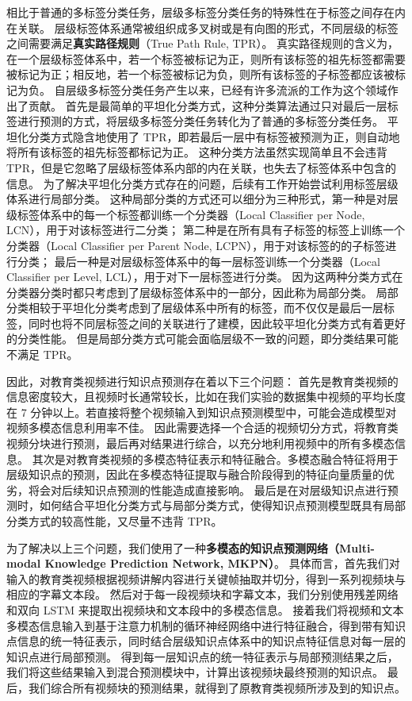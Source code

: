    相比于普通的多标签分类任务，层级多标签分类任务的特殊性在于标签之间存在内在关联。
    层级标签体系通常被组织成多叉树或是有向图的形式，不同层级的标签之间需要满足\textbf{真实路径规则}（True Path Rule, TPR）\cite{Valentini2009TruePR}。
    真实路径规则的含义为，在一个层级标签体系中，若一个标签被标记为正，则所有该标签的祖先标签都需要被标记为正；相反地，若一个标签被标记为负，则所有该标签的子标签都应该被标记为负。
    自层级多标签分类任务产生以来，已经有许多流派的工作为这个领域作出了贡献。
    首先是最简单的平坦化分类方式，这种分类算法通过只对最后一层标签\cite{Barbedo2007AutomaticGC}进行预测的方式，将层级多标签分类任务转化为了普通的多标签分类任务。
    平坦化分类方式隐含地使用了 TPR，即若最后一层中有标签被预测为正，则自动地将所有该标签的祖先标签都标记为正。
    这种分类方法虽然实现简单且不会违背 TPR，但是它忽略了层级标签体系内部的内在关联，也失去了标签体系中包含的信息。
    为了解决平坦化分类方式存在的问题，后续有工作开始尝试利用标签层级体系进行局部分类。
    这种局部分类的方式还可以细分为三种形式，第一种是对层级标签体系中的每一个标签都训练一个分类器（Local Classifier per Node, LCN）\cite{CesaBianchi2004IncrementalAF}，用于对该标签进行二分类；
    第二种是在所有具有子标签的标签上训练一个分类器（Local Classifier per Parent Node, LCPN）\cite{Secker2007AnEC}，用于对该标签的的子标签进行分类；
    最后一种是对层级标签体系中的每一层标签训练一个分类器（Local Classifier per Level, LCL）\cite{Freitas2007ATO}，用于对下一层标签进行分类。
    因为这两种分类方式在分类器分类时都只考虑到了层级标签体系中的一部分，因此称为局部分类。
    局部分类相较于平坦化分类考虑到了层级体系中所有的标签，而不仅仅是最后一层标签，同时也将不同层标签之间的关联进行了建模，因此较平坦化分类方式有着更好的分类性能。
    但是局部分类方式可能会面临层级不一致的问题，即分类结果可能不满足 TPR。

    因此，对教育类视频进行知识点预测存在着以下三个问题：
    首先是教育类视频的信息密度较大，且视频时长通常较长，比如在我们实验的数据集中视频的平均长度在 7 分钟以上。若直接将整个视频输入到知识点预测模型中，可能会造成模型对视频多模态信息利用率不佳。
    因此需要选择一个合适的视频切分方式，将教育类视频分块进行预测，最后再对结果进行综合，以充分地利用视频中的所有多模态信息。
    其次是对教育类视频的多模态特征表示和特征融合。多模态融合特征将用于层级知识点的预测，因此在多模态特征提取与融合阶段得到的特征向量质量的优劣，将会对后续知识点预测的性能造成直接影响。
    最后是在对层级知识点进行预测时，如何结合平坦化分类方式与局部分类方式，使得知识点预测模型既具有局部分类方式的较高性能，又尽量不违背 TPR。

    为了解决以上三个问题，我们使用了一种\textbf{多模态的知识点预测网络（Multi-modal Knowledge Prediction Network, MKPN）}。
    具体而言，首先我们对输入的教育类视频根据视频讲解内容进行关键帧抽取并切分，得到一系列视频块与相应的字幕文本段。
    然后对于每一段视频块和字幕文本，我们分别使用残差网络和双向 LSTM 来提取出视频块和文本段中的多模态信息。
    接着我们将视频和文本多模态信息输入到基于注意力机制的循环神经网络中进行特征融合，得到带有知识点信息的统一特征表示，同时结合层级知识点体系中的知识点特征信息对每一层的知识点进行局部预测。
    得到每一层知识点的统一特征表示与局部预测结果之后，我们将这些结果输入到混合预测模块中，计算出该视频块最终预测的知识点。
    最后，我们综合所有视频块的预测结果，就得到了原教育类视频所涉及到的知识点。

